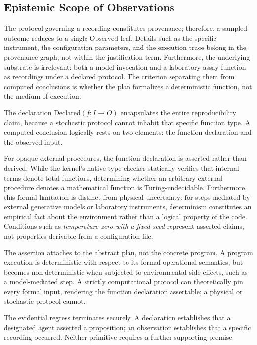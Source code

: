\documentclass[manuscript,nonacm=true]{acmart}
\begin{document}
\subsection{Epistemic Scope of Observations}
\label{sec:epistemic_scope}

The protocol governing a recording constitutes provenance; therefore, a sampled outcome reduces to a single $\mathrm{Observed}$ leaf. Details such as the specific instrument, the configuration parameters, and the execution trace belong in the provenance graph, not within the justification term. Furthermore, the underlying substrate is irrelevant: both a model invocation and a laboratory assay function as recordings under a declared protocol. The criterion separating them from computed conclusions is whether the plan formalizes a deterministic function, not the medium of execution.

The declaration $\mathrm{Declared}(f : I \to O)$ encapsulates the entire reproducibility claim, because a stochastic protocol cannot inhabit that specific function type. A computed conclusion logically rests on two elements: the function declaration and the observed input.

For opaque external procedures, the function declaration is asserted rather than derived. While the kernel's native type checker statically verifies that internal terms denote total functions, determining whether an arbitrary external procedure denotes a mathematical function is Turing-undecidable. Furthermore, this formal limitation is distinct from physical uncertainty: for steps mediated by external generative models or laboratory instruments, determinism constitutes an empirical fact about the environment rather than a logical property of the code. Conditions such as \emph{temperature zero with a fixed seed} represent asserted claims, not properties derivable from a configuration file.

The assertion attaches to the abstract plan, not the concrete program. A program execution is deterministic with respect to its formal operational semantics, but becomes non-deterministic when subjected to environmental side-effects, such as a model-mediated step. A strictly computational protocol can theoretically pin every formal input, rendering the function declaration assertable; a physical or stochastic protocol cannot.

The evidential regress terminates securely. A declaration establishes that a designated agent asserted a proposition; an observation establishes that a specific recording occurred. Neither primitive requires a further supporting premise.
\end{document}
